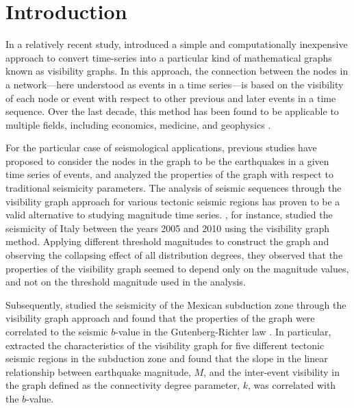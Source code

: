 
\section{Introduction}

In a relatively recent study, \citet{Lacasa2008} introduced a simple and computationally inexpensive approach to convert time-series into a particular kind of mathematical graphs known as visibility graphs. In this approach, the connection between the nodes in a network---here understood as events in a time series---is based on the visibility of each node or event with respect to other previous and later events in a time sequence. Over the last decade, this method has been found to be applicable to multiple fields, including economics, medicine, and geophysics \citep[e.g.,][]{Yang_2009_PA, Elsner_2009_GRL, Telesca2012_CSF, Wang2012, Long2013}.

For the particular case of seismological applications, previous studies have proposed to consider the nodes in the graph to be the earthquakes in a given time series of events, and analyzed the properties of the graph with respect to traditional seismicity parameters. The analysis of seismic sequences through the visibility graph approach for various tectonic seismic regions has proven to be a valid alternative to studying magnitude time series. \citet{Telesca2012}, for instance, studied the seismicity of Italy between the years 2005 and 2010 using the visibility graph method. Applying different threshold magnitudes to construct the graph and observing the collapsing effect of all distribution degrees, they observed that the properties of the visibility graph seemed to depend only on the magnitude values, and not on the threshold magnitude used in the analysis. 

Subsequently, \citet{Telesca2013} studied the seismicity of the Mexican subduction zone through the visibility graph approach and found that the properties of the graph were correlated to the seismic $b$-value in the Gutenberg-Richter law \citep{Gutenberg1944}. In particular, \citet{Telesca2013} extracted the characteristics of the visibility graph for five different tectonic seismic regions in the subduction zone and found that the slope in the linear relationship between earthquake magnitude, $M$, and the inter-event visibility in the graph defined as the connectivity degree parameter, $k$, was correlated with the $b$-value.

